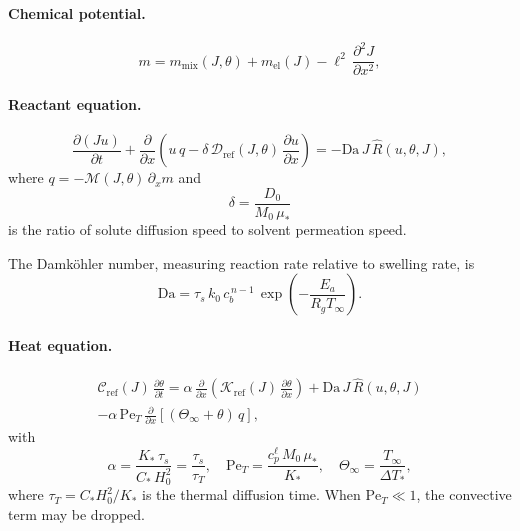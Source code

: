 \documentclass[11pt]{article}
\newcommand{\Ms}{\mathcal{M}}
\newcommand{\Ds}{\mathcal{D}}
\newcommand{\Cs}{\mathcal{C}}
\newcommand{\Ks}{\mathcal{K}}
\newcommand{\Da}{\mathrm{Da}}
\newcommand{\Pe}{\mathrm{Pe}}
\newcommand{\Rhat}{\widehat{R}}
\begin{document}
\paragraph{Chemical potential.}
\begin{equation}
  m = m_\mathrm{mix}(J,\theta) + m_\mathrm{el}(J) - \ell^2\,\frac{\partial^2 J}{\partial x^2},
  \label{eq:m_nondim_box}
\end{equation}

\paragraph{Reactant equation.}
\begin{equation}
  \frac{\partial(J u)}{\partial t}
  + \frac{\partial}{\partial x}\!\left(u\,q - \delta\,\Ds_\mathrm{ref}(J,\theta)\,\frac{\partial u}{\partial x}\right)
  = -\Da\,J\,\Rhat(u,\theta,J),
  \label{eq:u_nondim}
\end{equation}
where $q = -\Ms(J,\theta)\,\partial_x m$ and
\begin{equation}
  \delta = \frac{D_0}{M_0\,\mu_*}
\end{equation}
is the ratio of solute diffusion speed to solvent permeation speed.

The Damk\"ohler number, measuring reaction rate relative to swelling rate, is
\begin{equation}
  \Da = \tau_s\,k_0\,c_b^{\,n-1}\,\exp\!\left(-\frac{E_a}{R_g T_\infty}\right).
  \label{eq:Da}
\end{equation}

\paragraph{Heat equation.}
\begin{multline}
  \Cs_\mathrm{ref}(J)\,\frac{\partial\theta}{\partial t}
  = \alpha\,\frac{\partial}{\partial x}\!\left(\Ks_\mathrm{ref}(J)\,\frac{\partial\theta}{\partial x}\right)
  + \Da\,J\,\Rhat(u,\theta,J)
  \\
  - \alpha\,\Pe_T\,\frac{\partial}{\partial x}\!\left[(\Theta_\infty + \theta)\,q\right],
  \label{eq:theta_nondim}
\end{multline}
with
\begin{equation}
  \alpha = \frac{K_*\,\tau_s}{C_*\,H_0^2} = \frac{\tau_s}{\tau_T},
  \quad
  \Pe_T = \frac{c_p^\ell\,M_0\,\mu_*}{K_*},
  \quad
  \Theta_\infty = \frac{T_\infty}{\Delta T_*},
  \label{eq:thermal_params}
\end{equation}
where $\tau_T = C_*H_0^2/K_*$ is the thermal diffusion time.
When $\Pe_T \ll 1$, the convective term may be dropped.
\end{document}
